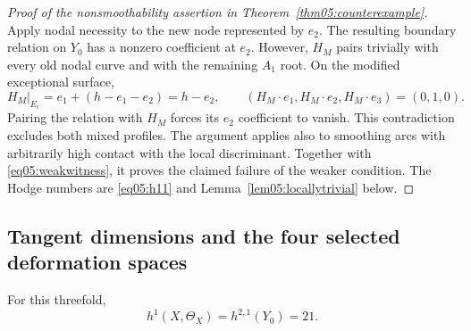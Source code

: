 \begin{proof}[Proof of the nonsmoothability assertion in
Theorem~\ref{thm05:counterexample}]
Apply nodal necessity to the new node represented by $e_2$.  The resulting
boundary relation on $Y_0$ has a nonzero coefficient at $e_2$.  However,
$H_M$ pairs trivially with every old nodal curve and with the remaining
$A_1$ root.  On the modified exceptional surface,
\[
 H_M|_{E_i}=e_1+(h-e_1-e_2)=h-e_2,
 \qquad (H_M\cdot e_1,H_M\cdot e_2,H_M\cdot e_3)=(0,1,0).
\]
Pairing the relation with $H_M$ forces its $e_2$ coefficient to vanish.
This contradiction excludes both mixed profiles.  The argument applies
also to smoothing arcs with arbitrarily high contact with the local
discriminant.  Together with \eqref{eq05:weakwitness}, it proves the
claimed failure of the weaker condition.  The Hodge numbers are
\eqref{eq05:h11} and Lemma~\ref{lem05:locallytrivial} below.
\end{proof}

\subsection{Tangent dimensions and the four selected deformation spaces}

\begin{lemma}\label{lem05:locallytrivial}
For this threefold,
\[
 h^1(X,\Theta_X)=h^{2,1}(Y_0)=21.
\]
\end{lemma}

